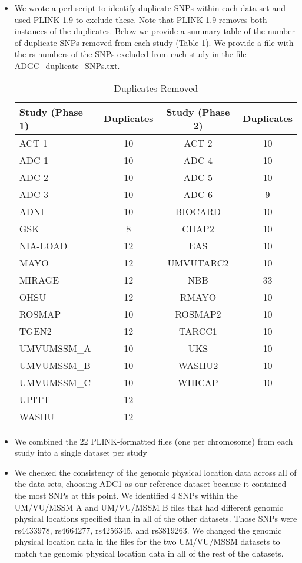 \documentclass[12pt]{article}
\begin{document}
\begin{itemize}
\item We wrote a perl script to identify duplicate SNPs within each data set and used PLINK 1.9 to exclude these. Note that PLINK 1.9 removes both instances of the duplicates. Below we provide a summary table of the number of duplicate SNPs removed from each study (Table \ref{table:dups}). We provide a file with the rs numbers of the SNPs excluded from each study in the file ADGC\_duplicate\_SNPs.txt.

\begin{table}[H] \caption{Duplicates Removed}
\begin{center}
\begin{tabular}{|lc|cc|}
\hline
Study (Phase 1)	&	Duplicates 	&	Study (Phase 2)	&	Duplicates \\
\hline
ACT 1	&	10	&	ACT 2	&	10	\\
ADC 1	&	10	&	ADC 4	&	10	\\
ADC 2	&	10	&	ADC 5	&	10	\\
ADC 3	&	10	&	ADC 6	&	9	\\
ADNI	&	10	&	BIOCARD	&	10	\\
GSK	&	8	&	CHAP2	&	10	\\
NIA-LOAD	&	12	&	EAS	&	10	\\
MAYO	&	12	&	UMVUTARC2	&	10	\\
MIRAGE	&	12	&	NBB	&	33	\\
OHSU	&	12	&	RMAYO	&	10	\\
ROSMAP	&	10	&	ROSMAP2	&	10	\\
TGEN2	&	12	&	TARCC1	&	10	\\
UMVUMSSM\_A	&	10	&	UKS	&	10	\\
UMVUMSSM\_B	&	10	&	WASHU2	&	10	\\
UMVUMSSM\_C	&	10	&	WHICAP	&	10	\\
UPITT	&	12	& & \\
WASHU	&	12	& & \\	 \hline
\end{tabular}
\end{center}
\label{table:dups}
\end{table}

\item We combined the 22 PLINK-formatted files (one per chromosome) from each study into a single dataset per study

\item We checked the consistency of the genomic physical location data across all of the data sets, choosing ADC1 as our reference dataset because it contained the most SNPs at this point. We identified 4 SNPs within the UM/VU/MSSM A and UM/VU/MSSM B files that had different genomic physical locations specified than in all of the other datasets. Those SNPs were rs4433978, rs4664277, rs4256345, and rs3819263. We changed the genomic physical location data in the files for the two UM/VU/MSSM datasets to match the genomic physical location data in all of the rest of the datasets.


\end{itemize}
\end{document}
